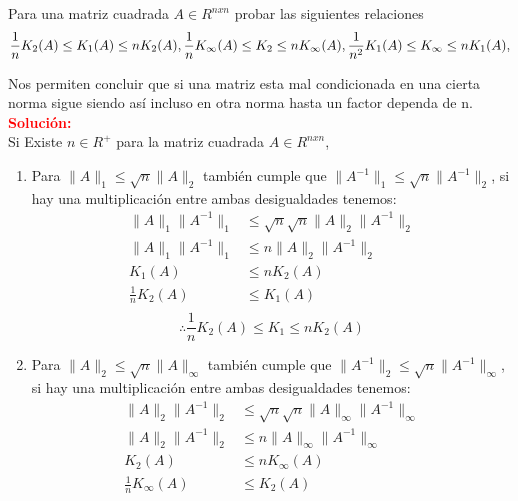 \providecommand{\norm}[1]{\lVert#1\rVert}
Para una matriz cuadrada $A \in R^{nxn}$ probar las siguientes relaciones
$$
    \frac{1}{n}K_2(A) \leq K_1(A) \leq nK_2(A),\frac{1}{n}K_{\infty}(A) \leq K_2 \leq nK_{\infty}(A),\\
    \frac{1}{n^2}K_1(A) \leq K_{\infty} \leq nK_1(A),
$$

Nos permiten concluir que si una matriz esta mal condicionada en una cierta norma  sigue siendo así incluso en otra norma hasta un factor dependa de n.\\

\noindent \textcolor{red}{\bf Solución:}\\
Si Existe $n \in R^+  $ para la  matriz cuadrada $A \in R^{nxn}$,
\begin{enumerate}[label=(\alph*)]
    \item Para $ \norm{A}_1 \leq \sqrt{n} \norm{A}_2 $  también cumple que $\norm{A^{-1}}_1 \leq \sqrt{n} \norm{A^{-1}}_2$, si hay una multiplicación entre ambas desigualdades tenemos:\\
\begin{align*}
    \norm{A}_1 \norm{A^{-1}}_1 &\leq \sqrt{n} \sqrt{n} \norm{A}_2 \norm{A^{-1}}_2\\
    \norm{A}_1 \norm{A^{-1}}_1 &\leq n \norm{A}_2 \norm{A^{-1}}_2\\
    K_1(A) &\leq nK_2(A)\\
    \frac{1}{n} K_2(A) &\leq K_1(A)\\
\end{align*}
   \[
        \therefore \frac{1}{n}K_2(A) \leq K_1 \leq  n K_2(A)
    \]
    \item Para $ \norm{A}_2 \leq \sqrt{n} \norm{A}_{\infty} $  también cumple que $\norm{A^{-1}}_2 \leq \sqrt{n} \norm{A^{-1}}_{\infty}$, si hay una multiplicación entre ambas desigualdades tenemos:\\
\begin{align*}
    \norm{A}_2 \norm{A^{-1}}_2 &\leq \sqrt{n} \sqrt{n} \norm{A}_{\infty} \norm{A^{-1}}_{\infty}\\
    \norm{A}_2 \norm{A^{-1}}_2 &\leq n \norm{A}_{\infty} \norm{A^{-1}}_{\infty}\\
    K_2(A) &\leq nK_{\infty}(A)\\
    \frac{1}{n} K_{\infty}(A) &\leq K_{2}(A)\\
\end{align*}


\end{enumerate}
